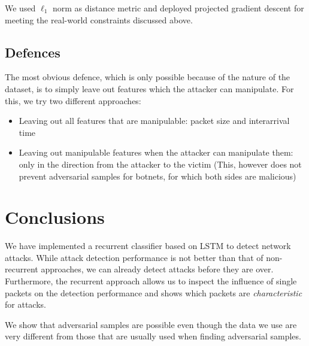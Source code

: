 \documentclass[sigconf,nonacm]{acmart}
\begin{document}
We used $\ell_1$ norm as distance metric and deployed projected gradient descent for meeting the real-world constraints discussed above.

\subsection{Defences}

The most obvious defence, which is only possible because of the nature of the dataset, is to simply leave out features which the attacker can manipulate. For this, we try two different approaches: 
\begin{itemize}
\item Leaving out all features that are manipulable: packet size and interarrival time
\item Leaving out manipulable features when the attacker can manipulate them: only in the direction from the attacker to the victim (This, however does not prevent adversarial samples for botnets, for which both sides are malicious)
\end{itemize}

\section{Conclusions}

We have implemented a recurrent classifier based on LSTM to detect network attacks. While attack detection performance is not better than that of non-recurrent approaches, we can already detect attacks before they are over. Furthermore, the recurrent approach allows us to inspect the influence of single packets on the detection performance and shows which packets are \textit{characteristic} for attacks. 

We show that adversarial samples are possible even though the data we use are very different from those that are usually used when finding adversarial samples. 



\end{document}
